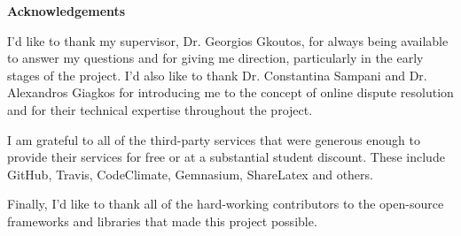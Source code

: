 \thispagestyle{empty}

\begin{center}
    {\LARGE\bf Acknowledgements}
\end{center}

I'd like to thank my supervisor, Dr. Georgios Gkoutos, for always being available to answer my questions and for giving me direction, particularly in the early stages of the project. I'd also like to thank Dr. Constantina Sampani and Dr. Alexandros Giagkos for introducing me to the concept of online dispute resolution and for their technical expertise throughout the project.

I am grateful to all of the third-party services that were generous enough to provide their services for free or at a substantial student discount. These include GitHub, Travis, CodeClimate, Gemnasium, ShareLatex and others.

Finally, I'd like to thank all of the hard-working contributors to the open-source frameworks and libraries that made this project possible.